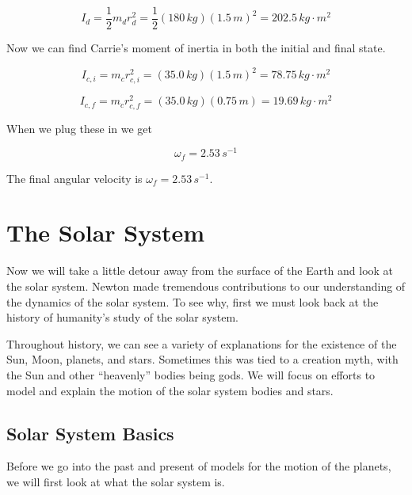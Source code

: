 \documentclass[12pt]{book}
\begin{document}
\begin{exampleblock}
\begin{equation}
I_d = \frac{1}{2} m_d r_d^2 = \frac{1}{2} (180 \, kg) (1.5 \, m)^2 = 202.5 \, kg \cdot m^2
\end{equation}

Now we can find Carrie's moment of inertia in both the initial and final state.

\begin{equation}
I_{c,i} = m_c r_{c,i}^2 = (35.0 \, kg)(1.5 \, m)^2 = 78.75 \, kg \cdot m^2
\end{equation}

\begin{equation}
I_{c,f} = m_c r_{c,f}^2 = (35.0 \, kg)(0.75 \, m) = 19.69 \, kg \cdot m^2
\end{equation}

When we plug these in we get

\begin{equation}
\omega_f = 2.53 \, s^{-1}
\end{equation}

The final angular velocity is $\omega_f = 2.53 \, s^{-1}$.

\end{exampleblock}

\chapter{The Solar System}
\setcounter{example}{1}
\addtocounter{chp}{1}
\label{solarchp}

Now we will take a little detour away from the surface of the Earth and look at the solar system. Newton made tremendous contributions to our understanding of the dynamics of the solar system. To see why, first we must look back at the history of humanity's study of the solar system.

Throughout history, we can see a variety of explanations for the existence of the Sun, Moon, planets, and stars. Sometimes this was tied to a creation myth, with the Sun and other ``heavenly'' bodies being gods. We will focus on efforts to model and explain the motion of the solar system bodies and stars. 

\section{Solar System Basics}

Before we go into the past and present of models for the motion of the planets, we will first look at what the solar system is. 
\end{document}
